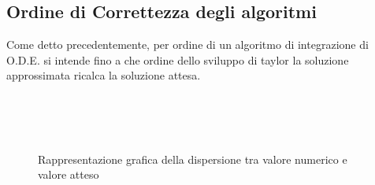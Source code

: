 \documentclass[11pt]{article}
\begin{document}
\subsection{Ordine di Correttezza degli algoritmi}
Come detto precedentemente, per ordine di un algoritmo di integrazione di O.D.E. si intende fino a che ordine dello sviluppo di taylor la soluzione approssimata ricalca la soluzione attesa.
\begin{figure}[!htbp]
	\caption{Rappresentazione grafica della dispersione tra valore numerico e valore atteso}
	\centering
	\\

 	\\

	\\
		\label{fig:tau}
\end{figure}
\end{document}
